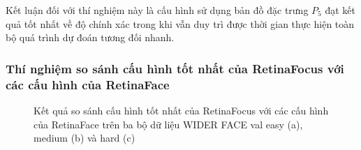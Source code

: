 {    \noindent
    Kết luận đối với thí nghiệm này là cấu hình sử dụng bản đồ đặc trưng ${P}_{5}$ đạt kết quả tốt nhất về độ chính xác trong khi vẫn duy trì được thời gian thực hiện toàn bộ quá trình dự đoán tương đối nhanh.


    \subsubsection*{Thí nghiệm so sánh cấu hình tốt nhất của RetinaFocus với các cấu hình của RetinaFace}

    \begin{figure}[H]
        \centering
        \caption{Kết quả so sánh cấu hình tốt nhất của RetinaFocus với các cấu hình của RetinaFace trên ba bộ dữ liệu WIDER FACE val easy (a), medium (b) và hard (c)}
        \label{fig:retinafocus_widerface_val_rtnf}
    \end{figure}

}
